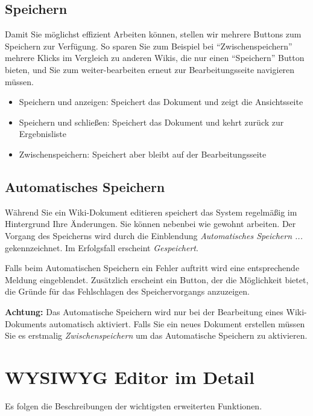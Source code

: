 \documentclass[article, a4paper, oneside, 11pt]{memoir}
\begin{document}
\subsection{Speichern}
Damit Sie möglichst effizient Arbeiten können, stellen wir mehrere Buttons zum Speichern zur Verfügung. So sparen Sie zum Beispiel bei "`Zwischenspeichern"' mehrere Klicks im Vergleich zu anderen Wikis, die nur einen "`Speichern"' Button bieten, und Sie zum weiter-bearbeiten erneut zur Bearbeitungsseite navigieren müssen.

\begin{itemize}
\item Speichern und anzeigen: Speichert das Dokument und zeigt die Ansichtsseite
\item Speichern und schließen: Speichert das Dokument und kehrt zurück zur Ergebnisliste
\item Zwischenspeichern: Speichert aber bleibt auf der Bearbeitungsseite
\end{itemize}

\subsection{Automatisches Speichern}
Während Sie ein Wiki-Dokument editieren speichert das System regelmäßig im Hintergrund Ihre Änderungen. Sie können nebenbei wie gewohnt arbeiten. Der Vorgang des Speicherns wird durch die Einblendung \emph{Automatisches Speichern ...} gekennzeichnet. Im Erfolgsfall erscheint \emph{Gespeichert}. 

Falls beim Automatischen Speichern ein Fehler auftritt wird eine entsprechende Meldung eingeblendet. Zusätzlich erscheint ein Button, der die Möglichkeit bietet, die Gründe für das Fehlschlagen des Speichervorgangs anzuzeigen.

\textbf{Achtung:} Das Automatische Speichern wird nur bei der Bearbeitung eines Wiki-Dokuments automatisch aktiviert. Falls Sie ein neues Dokument erstellen müssen Sie es erstmalig \emph{Zwischenspeichern} um das Automatische Speichern zu aktivieren. 




\section{WYSIWYG Editor im Detail}
Es folgen die Beschreibungen der wichtigsten erweiterten Funktionen.
\end{document}
